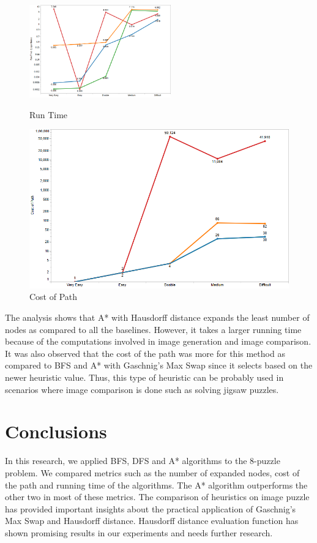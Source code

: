 \documentclass{svproc}
\begin{document}
\setlength{\intextsep}{5pt}
\begin{figure}
	\centering
	\begin{minipage}[b]{0.47\textwidth}
		\includegraphics[width=\textwidth, height=4cm]{Images/RunningTime.png}
		\caption{Run Time}
		\label{fig:time}
	\end{minipage}
	\begin{minipage}[b]{0.47\textwidth}
		\includegraphics[width=\textwidth]{Images/costofpath.png}
		\caption{Cost of Path}
		\label{fig:cost}
	\end{minipage}\hfill
\end{figure}

\noindent  The analysis shows that A* with Hausdorff distance expands the least number of nodes as compared to all the baselines. However, it takes a larger running time because of the computations involved in image generation and image comparison. It was also observed that the cost of the path was more for this method as compared to BFS and A* with Gaschnig's Max Swap since it selects based on the newer heuristic value. Thus, this type of heuristic can be probably used in scenarios where image comparison is done such as solving jigsaw puzzles. \\

\section{Conclusions}
In this research, we applied BFS, DFS and A* algorithms to the 8-puzzle problem. We compared metrics such as the number of expanded nodes, cost of the path and running time of the algorithms. The A* algorithm outperforms the other two in most of these metrics. The comparison of heuristics on image puzzle has provided important insights about the practical application of Gaschnig's Max Swap and Hausdorff distance. Hausdorff distance evaluation function has shown promising results in our experiments and needs further research.
\end{document}
